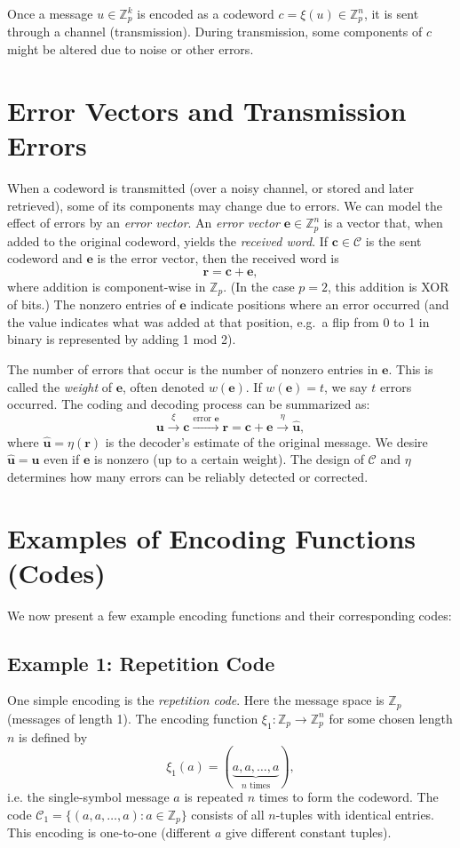 \documentclass[docmute]{article}
\begin{document}
Once a message $u \in \mathbb{Z}_p^k$ is encoded as a codeword $c = \xi(u) \in \mathbb{Z}_p^n$, it is sent through a channel (transmission). During transmission, some components of $c$ might be altered due to noise or other errors.

\section{Error Vectors and Transmission Errors}

When a codeword is transmitted (over a noisy channel, or stored and later retrieved), some of its components may change due to errors. We can model the effect of errors by an \emph{error vector}. An \emph{error vector} \(\mathbf{e} \in \mathbb{Z}_p^n\) is a vector that, when added to the original codeword, yields the \emph{received word}. If \(\mathbf{c} \in \mathcal{C}\) is the sent codeword and \(\mathbf{e}\) is the error vector, then the received word is
\[
  \mathbf{r} = \mathbf{c} + \mathbf{e},
\]
where addition is component-wise in \(\mathbb{Z}_p\). (In the case \(p=2\), this addition is XOR of bits.) The nonzero entries of \(\mathbf{e}\) indicate positions where an error occurred (and the value indicates what was added at that position, e.g.\ a flip from 0 to 1 in binary is represented by adding 1 mod 2).

The number of errors that occur is the number of nonzero entries in \(\mathbf{e}\). This is called the \emph{weight} of \(\mathbf{e}\), often denoted \(w(\mathbf{e})\). If \(w(\mathbf{e}) = t\), we say \(t\) errors occurred. The coding and decoding process can be summarized as:
\[
  \mathbf{u} \xrightarrow{\xi} \mathbf{c}
            \xrightarrow{\text{error }\mathbf{e}}
            \mathbf{r} = \mathbf{c} + \mathbf{e}
            \xrightarrow{\eta} \hat{\mathbf{u}},
\]
where \(\hat{\mathbf{u}} = \eta(\mathbf{r})\) is the decoder’s estimate of the original message. We desire \(\hat{\mathbf{u}} = \mathbf{u}\) even if \(\mathbf{e}\) is nonzero (up to a certain weight). The design of \(\mathcal{C}\) and \(\eta\) determines how many errors can be reliably detected or corrected.


\section{Examples of Encoding Functions (Codes)}

We now present a few example encoding functions and their corresponding codes:

\subsection*{Example 1: Repetition Code}
One simple encoding is the \emph{repetition code}. Here the message space is $\mathbb{Z}_p$ (messages of length 1). The encoding function $\xi_1: \mathbb{Z}_p \to \mathbb{Z}_p^n$ for some chosen length $n$ is defined by 
\[ \xi_1(a) = (\underbrace{a, a, \ldots, a}_{n \text{ times}}), \] 
i.e. the single-symbol message $a$ is repeated $n$ times to form the codeword. The code $\mathcal{C}_1 = \{(a,a,\ldots,a) : a \in \mathbb{Z}_p\}$ consists of all $n$-tuples with identical entries. This encoding is one-to-one (different $a$ give different constant tuples).
\end{document}
